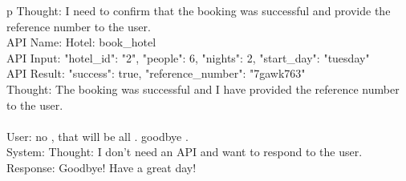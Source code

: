 \begin{table*}
\begin{tabular}{p\linewidth}
Thought: I need to confirm that the booking was successful and provide the reference number to the user.  \\
API Name: Hotel: book\_hotel  \\
API Input: {"hotel\_id": "2", "people": 6, "nights": 2, "start\_day": "tuesday"}  \\
API Result: {"success": true, "reference\_number": "7gawk763"}  \\
Thought: The booking was successful and I have provided the reference number to the user.  \\
\\
User: no , that will be all . goodbye .  \\
System: Thought: I don't need an API and want to respond to the user.  \\
Response: Goodbye! Have a great day!\\
\bottomrule
\end{tabular}
\end{table*}